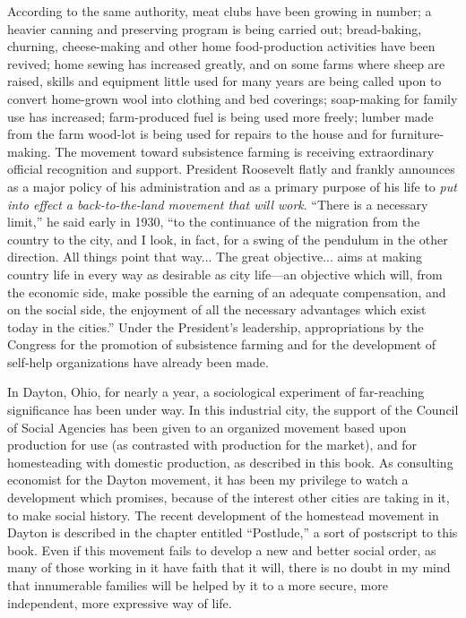 \documentclass{book}
\begin{document}
According to the same authority, meat clubs have been growing in number; a heavier canning and preserving program is being carried out; bread-baking, churning, cheese-making and other home food-production activities have been revived; home sewing has increased greatly, and on some farms where sheep are raised, skills and equipment little used for many years are being called upon to convert home-grown wool into clothing and bed coverings; soap-making for family use has increased; farm-produced fuel is being used more freely; lumber made from the farm wood-lot is being used for repairs to the house and for furniture-making. The movement toward subsistence farming is receiving extraordinary official recognition and support. President Roosevelt flatly and frankly announces as a major policy of his administration and as a primary purpose of his life to \emph{put into effect a back-to-the-land movement that will work}. “There is a necessary limit,” he said early in 1930, “to the continuance of the migration from the country to the city, and I look, in fact, for a swing of the pendulum in the other direction. All things point that way... The great objective... aims at making country life in every way as desirable as city life—an objective which will, from the economic side, make possible the earning of an adequate compensation, and on the social side, the enjoyment of all the necessary advantages which exist today in the cities.” Under the President’s leadership, appropriations by the Congress for the promotion of subsistence farming and for the development of self-help organizations have already been made.

In Dayton, Ohio, for nearly a year, a sociological experiment of far-reaching significance has been under way. In this industrial city, the support of the Council of Social Agencies has been given to an organized movement based upon production for use (as contrasted with production for the market), and for homesteading with domestic production, as described in this book. As consulting economist for the Dayton movement, it has been my privilege to watch a development which promises, because of the interest other cities are taking in it, to make social history. The recent development of the homestead movement in Dayton is described in the chapter entitled “Postlude,” a sort of postscript to this book. Even if this movement fails to develop a new and better social order, as many of those working in it have faith that it will, there is no doubt in my mind that innumerable families will be helped by it to a more secure, more independent, more expressive way of life.
\end{document}
